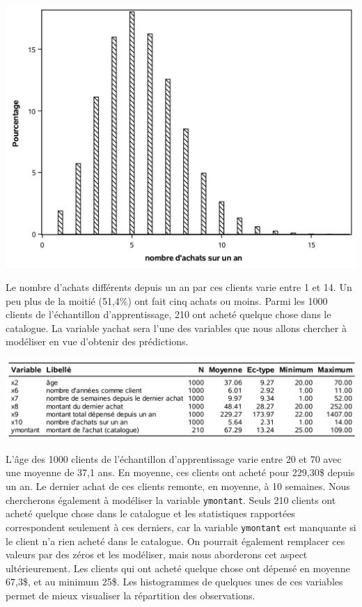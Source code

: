 \documentclass[
  11pt,
  letterpaper,
]{book}
\theoremstyle{definition}
\theoremstyle{definition}
\theoremstyle{definition}
\theoremstyle{remark}
\begin{document}
\begin{center}\includegraphics[width=0.9\linewidth]{figures/02-select-e4} \end{center}

Le nombre d'achats différents depuis un an par ces clients varie entre 1 et 14. Un peu plus de la moitié (51,4\%) ont fait cinq achats ou moins. Parmi les 1000 clients de l'échantillon d'apprentissage, 210 ont acheté quelque chose dans le catalogue. La variable yachat sera l'une des variables que nous allons chercher à modéliser en vue d'obtenir des prédictions.

\begin{center}\includegraphics[width=0.9\linewidth]{figures/02-select-e5} \end{center}

L'âge des 1000 clients de l'échantillon d'apprentissage varie entre 20 et 70 avec une moyenne de 37,1 ans. En moyenne, ces clients ont acheté pour 229,30\$ depuis un an. Le dernier achat de ces clients remonte, en moyenne, à 10 semaines. Nous chercherons également à modéliser la variable \texttt{ymontant}. Seuls 210 clients ont acheté quelque chose dans le catalogue et les statistiques rapportées correspondent seulement à ces derniers, car la variable \texttt{ymontant} est manquante si le client n'a rien acheté dans le catalogue. On pourrait également remplacer ces valeurs par des zéros et les modéliser, mais nous aborderons cet aspect ultérieurement. Les clients qui ont acheté quelque chose ont dépensé en moyenne 67,3\$, et au minimum 25\$. Les histogrammes de quelques unes de ces variables permet de mieux visualiser la répartition des observations.
\end{document}
